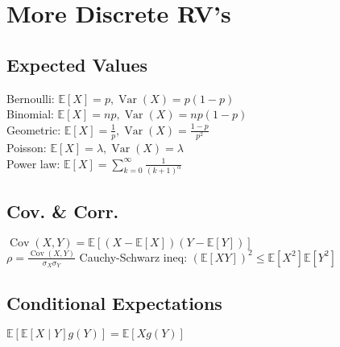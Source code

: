 \section{More Discrete RV's}

	\subsection*{Expected Values}
	Bernoulli: $\mathbb{E}\left[X\right] = p, \operatorname{Var}\left(X\right) = p\left(1 - p\right)$\\
	Binomial: $\mathbb{E}\left[X\right] = np, \operatorname{Var}\left(X\right) = np\left(1 - p\right)$\\
	Geometric: $\mathbb{E}\left[X\right] = \frac{1}{p}, \operatorname{Var}\left(X\right) = \frac{1 - p}{p^{2}}$\\
	Poisson: $\mathbb{E}\left[X\right] = \lambda, \operatorname{Var}\left(X\right) = \lambda$\\
	Power law: $\mathbb{E}\left[X\right] = \sum_{k = 0}^{\infty}\frac{1}{\left(k + 1\right)^{\alpha}}$
	
	\subsection*{Cov. \& Corr.}
	$\operatorname{Cov}\left(X, Y\right) = \mathbb{E}\left[\left(X - \mathbb{E}\left[X\right]\right)\left(Y - \mathbb{E}\left[Y\right]\right)\right]$\\
	$\rho = \frac{\operatorname{Cov}\left(X, Y\right)}{\sigma_{X}\sigma_{Y}}$
	Cauchy-Schwarz ineq: $\left(\mathbb{E}\left[XY\right]\right)^{2}\leq\mathbb{E}\left[X^{2}\right]\mathbb{E}\left[Y^{2}\right]$
	
	\subsection*{Conditional Expectations}
	$\mathbb{E}\left[\mathbb{E}\left[X\mid Y\right]g(Y)\right] = \mathbb{E}\left[Xg(Y)\right]$
	